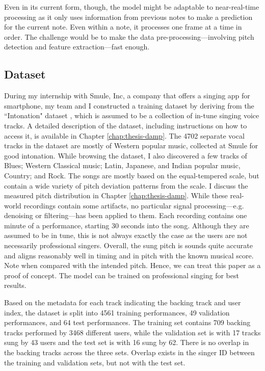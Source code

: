 Even in its current form, though, the model might be adaptable to near-real-time processing as it only uses information from previous notes to make a prediction for the current note. Even within a note, it processes one frame at a time in order. The challenge would be to make the data pre-processing---involving pitch detection and feature extraction---fast enough. 

\subsection{Dataset}
\label{sec:dataset-autotune}
During my internship with Smule, Inc, a company that offers a singing app for smartphone, my team and I constructed a training dataset by deriving from the ``Intonation" dataset \cite{wager2018intonation}, which is assumed to be a collection of in-tune singing voice tracks. A detailed description of the dataset, including instructions on how to access it, is available in Chapter \ref{chap:thesis-damp}. The 4702 separate vocal tracks in the dataset are mostly of Western popular music, collected at Smule for good intonation. While browsing the dataset, I also discovered a few tracks of Blues; Western Classical music; Latin, Japanese, and Indian popular music, Country; and Rock. The songs are mostly based on the equal-tempered scale, but contain a wide variety of pitch deviation patterns from the scale. I discuss the measured pitch distribution in Chapter \ref{chap:thesis-damp}. While these real-world recordings contain some artifacts, no particular signal processing---e.g. denoising or filtering---has been applied to them. Each recording contains one minute of a performance, starting 30 seconds into the song. Although they are assumed to be in tune, this is not always exactly the case as the users are not necessarily professional singers. Overall, the sung pitch is sounds quite accurate and aligns reasonably well in timing and in pitch with the known musical score. Note when compared with the intended pitch. Hence, we can treat this paper as a proof of concept. The model can be trained on professional singing for best results.

Based on the metadata for each track indicating the backing track and user index, the dataset is split into 4561 training performances, 49 validation performances, and 64 test performances. The training set contains 709 backing tracks performed by 3468 different users, while the validation set is with 17 tracks sung by 43 users and the test set is with 16 sung by 62. There is no overlap in the backing tracks across the three sets. Overlap exists in the singer ID between the training and validation sets, but not with the test set. 

